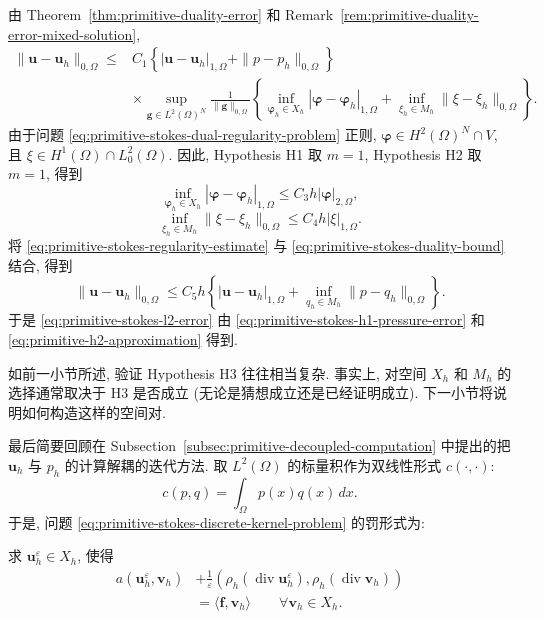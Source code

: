 \begin{Proof}
由 Theorem~\ref{thm:primitive-duality-error} 和
Remark~\ref{rem:primitive-duality-error-mixed-solution},
\begin{equation}\label{eq:primitive-stokes-duality-bound}
\begin{split}
\|\mathbf u-\mathbf u_h\|_{0,\Omega}
\leq{}&C_1\left\{
|\mathbf u-\mathbf u_h|_{1,\Omega}+\|p-p_h\|_{0,\Omega}
\right\}\\
&\times\sup_{\mathbf g\in L^2(\Omega)^N}
\frac{1}{\|\mathbf g\|_{0,\Omega}}
\left\{
\inf_{\boldsymbol\varphi_h\in X_h}
|\boldsymbol\varphi-\boldsymbol\varphi_h|_{1,\Omega}
+\inf_{\xi_h\in M_h}\|\xi-\xi_h\|_{0,\Omega}
\right\}.
\end{split}
\end{equation}
由于问题 \eqref{eq:primitive-stokes-dual-regularity-problem} 正则,
$\boldsymbol\varphi\in H^2(\Omega)^N\cap V$, 且
$\xi\in H^1(\Omega)\cap L_0^2(\Omega)$.
因此, Hypothesis H1 取 $m=1$, Hypothesis H2 取 $m=1$, 得到
\[
\inf_{\boldsymbol\varphi_h\in X_h}
|\boldsymbol\varphi-\boldsymbol\varphi_h|_{1,\Omega}
\leq C_3h|\boldsymbol\varphi|_{2,\Omega},
\]
\[
\inf_{\xi_h\in M_h}\|\xi-\xi_h\|_{0,\Omega}
\leq C_4h|\xi|_{1,\Omega}.
\]
将 \eqref{eq:primitive-stokes-regularity-estimate} 与
\eqref{eq:primitive-stokes-duality-bound} 结合, 得到
\[
\|\mathbf u-\mathbf u_h\|_{0,\Omega}
\leq C_5h\left\{
|\mathbf u-\mathbf u_h|_{1,\Omega}
+\inf_{q_h\in M_h}\|p-q_h\|_{0,\Omega}
\right\}.
\]
于是 \eqref{eq:primitive-stokes-l2-error} 由
\eqref{eq:primitive-stokes-h1-pressure-error} 和
\eqref{eq:primitive-h2-approximation} 得到.
\end{Proof}

如前一小节所述, 验证 Hypothesis H3 往往相当复杂.
事实上, 对空间 $X_h$ 和 $M_h$ 的选择通常取决于 H3 是否成立
(无论是猜想成立还是已经证明成立). 下一小节将说明如何构造这样的空间对.

最后简要回顾在 Subsection~\ref{subsec:primitive-decoupled-computation}
中提出的把 $\mathbf u_h$ 与 $p_h$ 的计算解耦的迭代方法.
取 $L^2(\Omega)$ 的标量积作为双线性形式 $c(\cdot,\cdot)$:
\[
c(p,q)=\int_\Omega p(x)q(x)\,dx.
\]
于是, 问题 \eqref{eq:primitive-stokes-discrete-kernel-problem} 的罚形式为:

求 $\mathbf u_h^\varepsilon\in X_h$, 使得
\begin{equation}\label{eq:primitive-stokes-penalty-problem}
\begin{split}
a(\mathbf u_h^\varepsilon,\mathbf v_h)
&+\frac{1}{\varepsilon}
(\rho_h(\operatorname{div}\mathbf u_h^\varepsilon),
\rho_h(\operatorname{div}\mathbf v_h))\\
&=\langle\mathbf f,\mathbf v_h\rangle
\qquad\forall\mathbf v_h\in X_h.
\end{split}
\end{equation}

